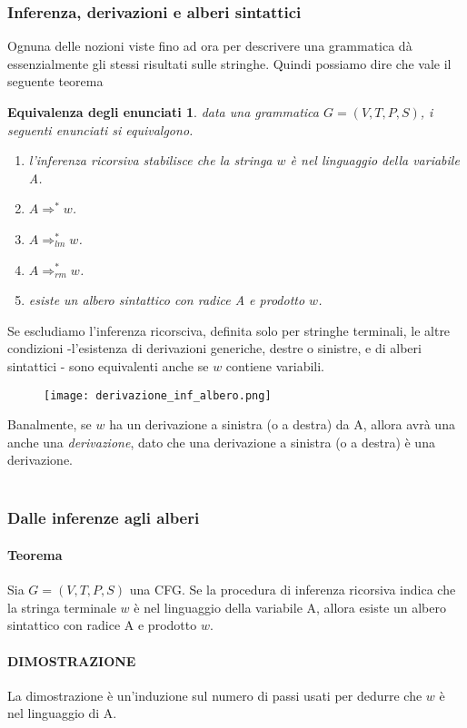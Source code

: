 \documentclass[11pt]{article}
\newtheorem{eqEnunciati}{Equivalenza degli enunciati}
\begin{document}
\subsubsection{Inferenza, derivazioni e alberi sintattici}
Ognuna delle nozioni viste fino ad ora  per descrivere una grammatica dà essenzialmente gli stessi risultati sulle stringhe. Quindi possiamo dire che vale il seguente teorema
\begin{eqEnunciati}
data una grammatica $G=(V,T,P,S)$, i seguenti enunciati si equivalgono.
\begin{enumerate}
	\item l'inferenza ricorsiva stabilisce che la stringa $w$ è nel linguaggio della variabile A.
	\item $A\Rightarrow^{*} w$.
	\item $A\Rightarrow^{*}_{lm} w$.
	\item $A\Rightarrow^{*}_{rm} w$.
	\item esiste un albero sintattico con radice A e prodotto $w$.
\end{enumerate}
\end{eqEnunciati}
Se escludiamo l'inferenza ricorsciva, definita solo per stringhe terminali, le altre condizioni -l'esistenza di derivazioni generiche, destre o sinistre, e di alberi sintattici - sono equivalenti anche se $w$ contiene variabili.
\begin{figure}[H]
\texttt{[image: derivazione\_inf\_albero.png]}
\centering
\end{figure}

Banalmente, se $w$ ha un derivazione a sinistra (o a destra) da A, allora avrà una anche una \textit{derivazione}, dato che una derivazione a sinistra (o a destra) è una derivazione.
\\\\
\subsubsection*{Dalle inferenze agli alberi}
\paragraph*{\textbf{Teorema}} Sia $G=(V,T,P,S)$ una CFG. Se la procedura di inferenza ricorsiva indica che la stringa terminale $w$ è nel linguaggio della variabile A, allora esiste un albero sintattico con radice A e prodotto $w$.
\paragraph*{DIMOSTRAZIONE} La dimostrazione è un'induzione sul numero di passi usati per dedurre che $w$ è nel linguaggio di A.
\end{document}

